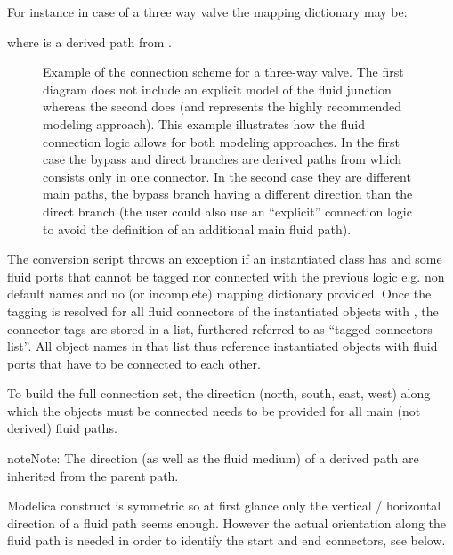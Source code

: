 \documentclass[letterpaper,10pt, openany,english]{sphinxmanual}
\begin{document}
\begin{enumerate}
\begin{itemize}
For instance in case of a three way valve the mapping dictionary may be:

 where  is a derived path from .

\end{itemize}

\end{enumerate}

\begin{figure}[htbp]
\centering
\capstart

\noindent{}
\caption{Example of the connection scheme for a three-way valve. The first diagram does not include an explicit model of the fluid junction whereas the second does (and represents the highly recommended modeling approach). This example illustrates how the fluid connection logic allows for both modeling approaches. In the first case the bypass and direct branches are derived paths from  which consists only in one connector. In the second case they are different main paths, the bypass branch having a different direction than the direct branch (the user could also use an “explicit” connection logic to avoid the definition of an additional main fluid path).}\label{\detokenize{requirements:linkage-connect-3wv}}\end{figure}

The conversion script throws an exception if an instantiated class has  and some fluid ports that cannot be tagged nor connected with the previous logic e.g. non default names and no (or incomplete) mapping dictionary provided.
Once the tagging is resolved for all fluid connectors of the instantiated objects with , the connector tags are stored in a list, furthered referred to as “tagged connectors list”.
All object names in that list thus reference instantiated objects with fluid ports that have to be connected to each other.

To build the full connection set, the direction (north, south, east, west) along which the objects must be connected needs to be provided for all main (not derived) fluid paths.

\begin{sphinxadmonition}{note}{Note:}
The direction (as well as the fluid medium) of a derived path are inherited from the parent path.

Modelica  construct is symmetric so at first glance only the vertical / horizontal direction of a fluid path seems enough. However the actual orientation along the fluid path is needed in order to identify the start and end connectors, see below.
\end{sphinxadmonition}
\end{document}
